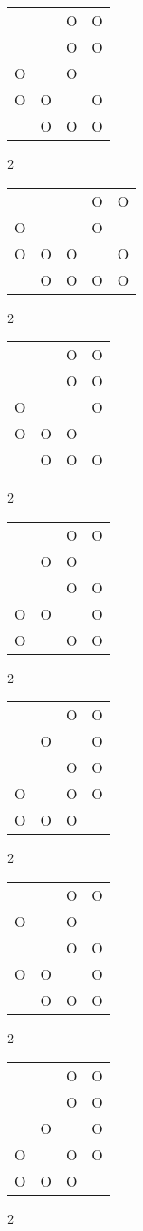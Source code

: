\begin{tabular}{|m{0.2cm}m{0.2cm}m{0.2cm}m{0.2cm}|}\hline
 & &O&O\\
 & &O&O\\
O& &O& \\
O&O& &O\\
 &O&O&O\\
\hline\end{tabular}2
\begin{tabular}{|m{0.2cm}m{0.2cm}m{0.2cm}m{0.2cm}m{0.2cm}|}\hline
 & & &O&O\\
O& & &O& \\
O&O&O& &O\\
 &O&O&O&O\\
\hline\end{tabular}2
\begin{tabular}{|m{0.2cm}m{0.2cm}m{0.2cm}m{0.2cm}|}\hline
 & &O&O\\
 & &O&O\\
O& & &O\\
O&O&O& \\
 &O&O&O\\
\hline\end{tabular}2
\begin{tabular}{|m{0.2cm}m{0.2cm}m{0.2cm}m{0.2cm}|}\hline
 & &O&O\\
 &O&O& \\
 & &O&O\\
O&O& &O\\
O& &O&O\\
\hline\end{tabular}2
\begin{tabular}{|m{0.2cm}m{0.2cm}m{0.2cm}m{0.2cm}|}\hline
 & &O&O\\
 &O& &O\\
 & &O&O\\
O& &O&O\\
O&O&O& \\
\hline\end{tabular}2
\begin{tabular}{|m{0.2cm}m{0.2cm}m{0.2cm}m{0.2cm}|}\hline
 & &O&O\\
O& &O& \\
 & &O&O\\
O&O& &O\\
 &O&O&O\\
\hline\end{tabular}2
\begin{tabular}{|m{0.2cm}m{0.2cm}m{0.2cm}m{0.2cm}|}\hline
 & &O&O\\
 & &O&O\\
 &O& &O\\
O& &O&O\\
O&O&O& \\
\hline\end{tabular}2

